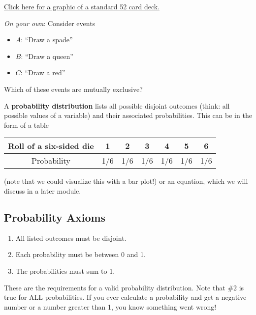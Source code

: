 \documentclass[
]{book}
\providecommand{\tightlist}{%
  \setlength{\itemsep}{0pt}\setlength{\parskip}{0pt}}
\begin{document}
\href{https://www.cis.upenn.edu/~cis110/17fa/hw/hw08/standard52.jpg}{Click here for a graphic of a standard 52 card deck.}

\emph{On your own}: Consider events

\begin{itemize}
\tightlist
\item
  \(A\): ``Draw a spade''
\item
  \(B\): ``Draw a queen''
\item
  \(C\): ``Draw a red''
\end{itemize}

Which of these events are mutually exclusive?

A \textbf{probability distribution} lists all possible disjoint outcomes (think: all possible values of a variable) and their associated probabilities. This can be in the form of a table

\begin{longtable}[]{@{}ccccccc@{}}
\toprule
Roll of a six-sided die & 1 & 2 & 3 & 4 & 5 & 6 \\
\midrule
\endhead
Probability & 1/6 & 1/6 & 1/6 & 1/6 & 1/6 & 1/6 \\
\bottomrule
\end{longtable}

(note that we could visualize this with a bar plot!) or an equation, which we will discuss in a later module.

\hypertarget{probability-axioms}{%
\subsection{Probability Axioms}\label{probability-axioms}}

\begin{enumerate}
\def\labelenumi{\arabic{enumi}.}
\tightlist
\item
  All listed outcomes must be disjoint.
\item
  Each probability must be between 0 and 1.
\item
  The probabilities must sum to 1.
\end{enumerate}

These are the requirements for a valid probability distribution. Note that \#2 is true for ALL probabilities. If you ever calculate a probability and get a negative number or a number greater than 1, you know something went wrong!
\end{document}
